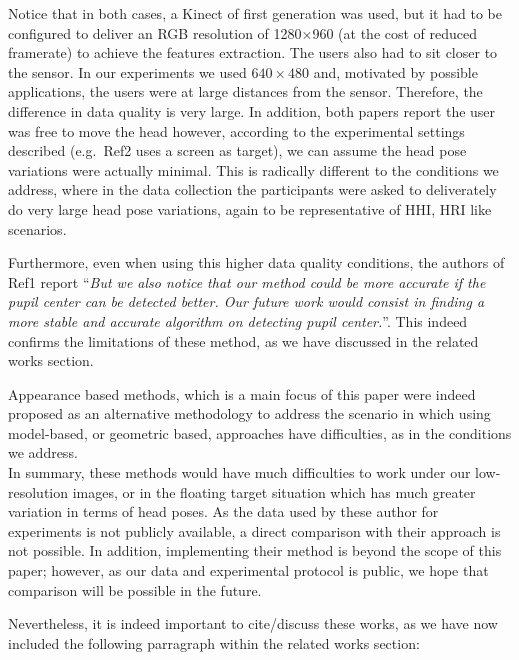 {Notice that in both cases, a Kinect of first generation was used, but it had to be
configured to deliver an RGB resolution
of 1280$\times$960 (at the cost of reduced framerate) to achieve the features extraction. The users also had to sit closer to the sensor. In our experiments
we used $640\times480$
and, motivated by possible applications, the users were at large distances from the sensor. Therefore, the difference in data quality is very large.
In addition, both papers report the user was free to move the head however, according to the experimental settings described (e.g.~Ref2 uses a screen as target),
we can assume the head pose variations were actually minimal. This is radically different to the conditions we address, where in the data collection
the participants were asked to deliverately do very large head pose variations, again to be representative of HHI, HRI like scenarios.

Furthermore, even when using this higher data quality conditions, the authors of Ref1 report ``{\em But we also notice that our method could be more
accurate if the pupil center can be detected better. Our future
work would consist in finding a more stable and accurate
algorithm on detecting pupil center.}''. This indeed confirms the limitations of these method, as we have discussed in the related works section.

%
%
Appearance based methods, which is a main focus of this paper  were indeed proposed as an alternative methodology to address 
the scenario in which using model-based, or geometric based, approaches have difficulties, as in the conditions we address. \\[1mm]
%
%
In summary, these methods would have much difficulties to work under our low-resolution images, or in the floating target situation which has much greater 
variation in terms of head poses. 
As the data used by these author for experiments is not publicly available, a direct comparison with their approach is not possible. 
In addition, implementing their method is beyond the scope of this paper; however, as our data and experimental protocol 
is public, we hope that comparison will be possible in the future.

Nevertheless, it is indeed important to cite/discuss these works, as we have now included the following parragraph within the related works section:

}
